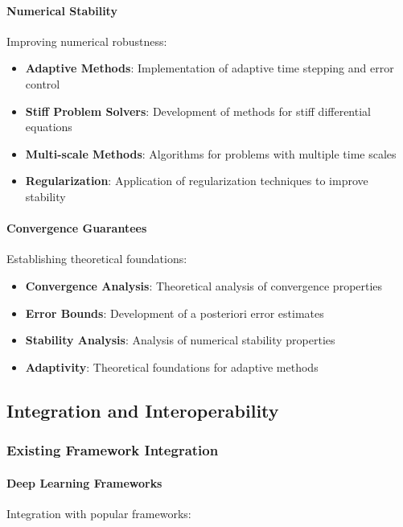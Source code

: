 \paragraph{Numerical Stability}
Improving numerical robustness:

\begin{itemize}
    \item \textbf{Adaptive Methods}: Implementation of adaptive time stepping and error control
    \item \textbf{Stiff Problem Solvers}: Development of methods for stiff differential equations
    \item \textbf{Multi-scale Methods}: Algorithms for problems with multiple time scales
    \item \textbf{Regularization}: Application of regularization techniques to improve stability
\end{itemize}

\paragraph{Convergence Guarantees}
Establishing theoretical foundations:

\begin{itemize}
    \item \textbf{Convergence Analysis}: Theoretical analysis of convergence properties
    \item \textbf{Error Bounds}: Development of a posteriori error estimates
    \item \textbf{Stability Analysis}: Analysis of numerical stability properties
    \item \textbf{Adaptivity}: Theoretical foundations for adaptive methods
\end{itemize}

\subsection{Integration and Interoperability}

\subsubsection{Existing Framework Integration}

\paragraph{Deep Learning Frameworks}
Integration with popular frameworks:

